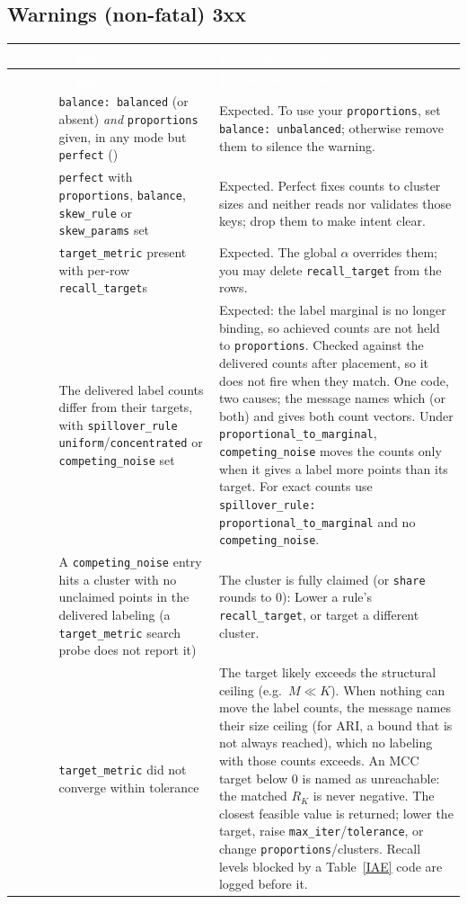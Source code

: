 \documentclass[a4paper,11pt]{article}
\newcommand{\wcode}[1]{\textcolor{warnamber}{\bfseries\ttfamily #1}}
\newcommand{\headrow}{\rowcolor{headblue}}
\newcommand{\hc}[1]{\textcolor{white}{\bfseries #1}}
\begin{document}
\subsection{Warnings (non-fatal) \texorpdfstring{\wcode{3xx}}{3xx} }
\begin{longtable}{@{}L{1.0cm} L{5.2cm} L{8.8cm}@{}}
\toprule
\headrow \hc{Code} & \hc{Trigger} & \hc{Recommendation} \\
\midrule
\endfirsthead
\headrow \hc{Code} & \hc{Trigger} & \hc{Recommendation} \\ \midrule
\endhead
\wcode{301} & \texttt{balance: balanced} (or absent) \emph{and} \texttt{proportions} given, in any mode but \texttt{perfect} (\wcode{302}) & Expected. To use your \texttt{proportions}, set \texttt{balance: unbalanced}; otherwise remove them to silence the warning. \\
\wcode{302} & \texttt{perfect} with \texttt{proportions}, \texttt{balance}, \texttt{skew\_rule} or \texttt{skew\_params} set & Expected. Perfect fixes counts to cluster sizes and neither reads nor validates those keys; drop them to make intent clear. \\
\wcode{303} & \texttt{target\_metric} present with per-row \texttt{recall\_target}s & Expected. The global $\alpha$ overrides them; you may delete \texttt{recall\_target} from the rows. \\
\wcode{304} & The delivered label counts differ from their targets, with \texttt{spillover\_rule} \texttt{uniform}/\texttt{concentrated} or \texttt{competing\_noise} set & Expected: the label marginal is no longer binding, so achieved counts are not held to \texttt{proportions}. Checked against the delivered counts after placement, so it does not fire when they match. One code, two causes; the message names which (or both) and gives both count vectors. Under \texttt{proportional\_to\_marginal}, \texttt{competing\_noise} moves the counts only when it gives a label more points than its target. For exact counts use \texttt{spillover\_rule: proportional\_to\_marginal} and no \texttt{competing\_noise}. \\
\wcode{305} & A \texttt{competing\_noise} entry hits a cluster with no unclaimed points in the delivered labeling (a \texttt{target\_metric} search probe does not report it) & The cluster is fully claimed (or \texttt{share} rounds to $0$): Lower a rule's \texttt{recall\_target}, or target a different cluster. \\
\wcode{306} & \texttt{target\_metric} did not converge within tolerance & The target likely exceeds the structural ceiling (e.g.\ $M\ll K$). When nothing can move the label counts, the message names their size ceiling (for ARI, a bound that is not always reached), which no labeling with those counts exceeds. An MCC target below $0$ is named as unreachable: the matched $R_K$ is never negative. The closest feasible value is returned; lower the target, raise \texttt{max\_iter}/\texttt{tolerance}, or change \texttt{proportions}/clusters. Recall levels blocked by a Table~\ref{IAE} code are logged before it. \\

\end{longtable}
\end{document}
